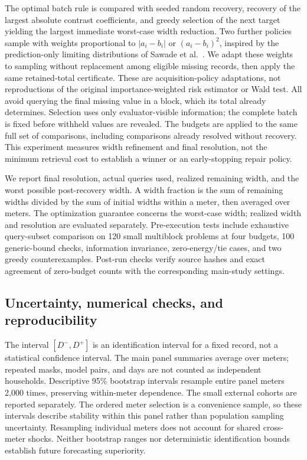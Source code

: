 \documentclass[12pt]{article}
\begin{document}
The optimal batch rule is compared with seeded random recovery, recovery
of the largest absolute contrast coefficients, and greedy selection of the
next target yielding the largest immediate worst-case width reduction.
Two further policies sample with weights proportional to $|a_i-b_i|$ or
$(a_i-b_i)^2$, inspired by the prediction-only limiting distributions of
Sawade et al.\ \cite{sawade}. We adapt these weights to sampling without
replacement among eligible missing records, then apply the same retained-total
certificate. These are acquisition-policy adaptations, not reproductions
of the original importance-weighted risk estimator or Wald test.
All avoid querying the final missing value in a block, which its total
already determines. Selection uses only evaluator-visible information;
the complete batch is fixed before withheld values are revealed.
The budgets are applied to the same full set of comparisons, including
comparisons already resolved without recovery. This experiment measures
width refinement and final resolution, not the minimum retrieval cost to
establish a winner or an early-stopping repair policy.

We report final resolution, actual queries used, realized remaining width,
and the worst possible post-recovery width. A width fraction is the sum of
remaining widths divided by the sum of initial widths within a meter,
then averaged over meters. The optimization guarantee concerns the
worst-case width; realized width and resolution are evaluated separately.
Pre-execution tests include exhaustive query-subset comparison on 120
small multiblock problems at four budgets, 100 generic-bound checks,
information invariance, zero-energy/tie cases, and two greedy counterexamples.
Post-run checks verify source hashes and exact agreement of zero-budget
counts with the corresponding main-study settings.



\subsection{Uncertainty, numerical checks, and reproducibility}
The interval $[D^-,D^+]$ is an identification interval for a fixed record,
not a statistical confidence interval. The main panel summaries average
over meters; repeated masks, model pairs, and days are not counted as
independent households. Descriptive 95\% bootstrap intervals resample
entire panel meters 2,000 times, preserving within-meter dependence. The
small external cohorts are reported separately. The ordered meter selection
is a convenience sample, so these intervals describe stability within this
panel rather than population sampling uncertainty. Resampling individual
meters does not account for shared cross-meter shocks. Neither bootstrap ranges
nor deterministic identification bounds establish future forecasting
superiority.
\end{document}
